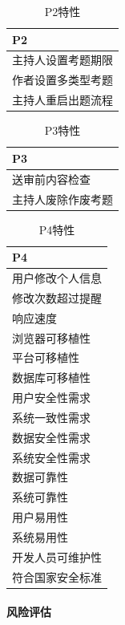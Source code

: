 \documentclass[hyperref, a4paper]{ctexart}
\let\oldparagraph\paragraph
\renewcommand{\paragraph}[1]{\oldparagraph{#1}\mbox{}}
\begin{document}
\begin{table}[h]
\centering
\caption{P2特性}
\begin{tabular}{|p{10cm}|}
\hline
P2\\
\hline
主持人设置考题期限\\
\hline
作者设置多类型考题\\
\hline
主持人重启出题流程\\
\hline
\end{tabular}
\end{table}

\begin{table}[h]
\centering
\caption{P3特性}
\begin{tabular}{|p{10cm}|}
\hline
P3\\
\hline
送审前内容检查\\
\hline
主持人废除作废考题\\
\hline
\end{tabular}
\end{table}

\begin{table}[h]
\centering
\caption{P4特性}
\begin{tabular}{|p{10cm}|}
\hline
P4\\
\hline
用户修改个人信息\\
\hline
修改次数超过提醒\\
\hline
响应速度\\
\hline
浏览器可移植性\\
\hline
平台可移植性\\
\hline
数据库可移植性\\
\hline
用户安全性需求\\
\hline
系统一致性需求\\
\hline
数据安全性需求\\
\hline
系统安全性需求\\
\hline
数据可靠性\\
\hline
系统可靠性\\
\hline
用户易用性\\
\hline
系统易用性\\
\hline
开发人员可维护性\\
\hline
符合国家安全标准\\
\hline
\end{tabular}
\end{table}

\hypertarget{ux98ceux9669ux8bc4ux4f30}{%
\paragraph{风险评估}\label{ux98ceux9669ux8bc4ux4f30}}
\end{document}
